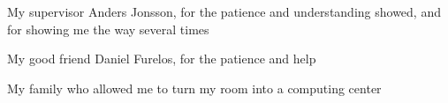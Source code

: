 \newpage
\thispagestyle{empty}
\vfill
{}
My supervisor Anders Jonsson, for the patience and understanding showed, and for showing me the way several times

My good friend Daniel Furelos, for the patience and help

My family who allowed me to turn my room into a computing center
\vfill